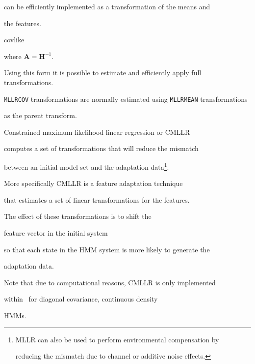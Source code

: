 can be efficiently implemented as a transformation of the means and 


the features.


 {covlike}


where $\bm{A}=\bm{H}^{-1}$.


Using this form it is possible to estimate and efficiently apply full transformations.


{\tt MLLRCOV} transformations are normally estimated using {\tt MLLRMEAN} transformations


as the parent transform.










Constrained maximum likelihood linear regression or CMLLR


computes a set of transformations that will reduce the mismatch


between an initial model set and the adaptation data\footnote{


MLLR can also be used to perform environmental compensation by


reducing the mismatch due to channel or additive noise effects.}.


More specifically CMLLR is a feature adaptation technique


that estimates a set of linear transformations for the features. 


The effect of these transformations is to shift the


feature vector in the initial system 


so that each state in the HMM system is more likely to generate the 


adaptation data.


Note that due to computational reasons, CMLLR is only implemented


within \HTK\ for diagonal covariance, continuous density


HMMs.





